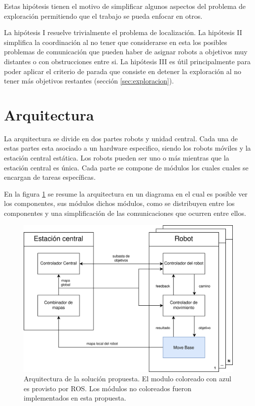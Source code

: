 Estas hipótesis tienen el motivo de simplificar algunos aspectos del
problema de exploración permitiendo que el trabajo se pueda enfocar en otros.

La hipótesis I resuelve trivialmente el problema de localización. La hipótesis
II simplifica la coordinación al no tener que considerarse en esta los posibles
problemas de comunicación que pueden haber de asignar robots a objetivos muy
distantes o con obstrucciones entre si. La hipótesis III es útil
principalmente para poder aplicar el criterio de parada que consiste en detener
la exploración al no tener más objetivos restantes (sección
\ref{sec:exploracion}). 

\section{Arquitectura}
La arquitectura se divide en dos partes robots y unidad central.  Cada una de
estas partes esta asociado a un hardware especifico, siendo los robots móviles
y la estación central estática. Los robots pueden ser uno o más mientras que la
estación central es única. Cada parte se compone de módulos los cuales cuales se
encargan de tareas específicas. 

En la figura \ref{fig:arquitectura} se resume la arquitectura en un diagrama en
el cual es posible ver los componentes, sus módulos dichos módulos, como se
distribuyen entre los componentes y una simplificación de las comunicaciones
que ocurren entre ellos.


\begin{figure}[H]
  \center
  \includegraphics[width=1\linewidth]{imagenes/arquitectura.png}
  \caption[Arquitectura de la solucion propuesta.]{Arquitectura de la solución propuesta. El modulo coloreado con azul es provisto por ROS. Los módulos no coloreados fueron  implementados en esta propuesta.}
  \label{fig:arquitectura}
\end{figure} 

